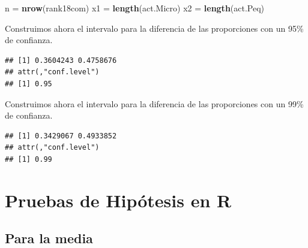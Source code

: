 \documentclass[letterpaper,]{book}
\newenvironment{Shaded}{\begin{snugshade}}{\end{snugshade}}
\newcommand{\DataTypeTok}[1]{\textcolor[rgb]{0.13,0.29,0.53}{#1}}
\newcommand{\FloatTok}[1]{\textcolor[rgb]{0.00,0.00,0.81}{#1}}
\newcommand{\KeywordTok}[1]{\textcolor[rgb]{0.13,0.29,0.53}{\textbf{#1}}}
\newcommand{\NormalTok}[1]{#1}
\newcommand{\OperatorTok}[1]{\textcolor[rgb]{0.81,0.36,0.00}{\textbf{#1}}}
\newcommand{\StringTok}[1]{\textcolor[rgb]{0.31,0.60,0.02}{#1}}
\begin{document}
\begin{Shaded}
\begin{Highlighting}[]
\NormalTok{n =}\StringTok{ }\KeywordTok{nrow}\NormalTok{(rank18com)}
\NormalTok{x1 =}\StringTok{ }\KeywordTok{length}\NormalTok{(act.Micro)}
\NormalTok{x2 =}\StringTok{ }\KeywordTok{length}\NormalTok{(act.Peq)}
\end{Highlighting}
\end{Shaded}

Construimos ahora el intervalo para la diferencia de las proporciones con un 95\% de confianza.

\begin{Shaded}
\end{Shaded}

\begin{verbatim}
## [1] 0.3604243 0.4758676
## attr(,"conf.level")
## [1] 0.95
\end{verbatim}

Construimos ahora el intervalo para la diferencia de las proporciones con un 99\% de confianza.

\begin{Shaded}
\end{Shaded}

\begin{verbatim}
## [1] 0.3429067 0.4933852
## attr(,"conf.level")
## [1] 0.99
\end{verbatim}

\hypertarget{pruebas-de-hipotesis-en-r}{%
\section{Pruebas de Hipótesis en R}\label{pruebas-de-hipotesis-en-r}}

\hypertarget{para-la-media-1}{%
\subsection{Para la media}\label{para-la-media-1}}
\end{document}

